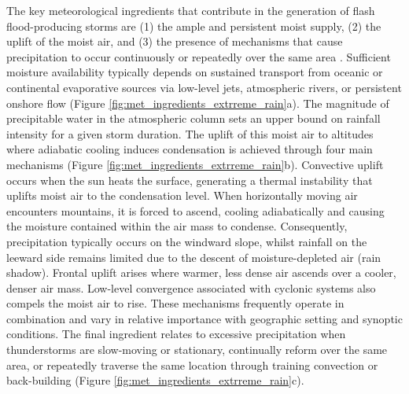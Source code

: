 The  key meteorological ingredients that contribute in the generation of flash flood-producing storms are (1) the ample and persistent moist supply, (2) the uplift of the moist air, and (3) the presence of mechanisms that cause precipitation to occur continuously or repeatedly over the same area \citep{Doswell_1996}. Sufficient moisture availability typically depends on sustained transport from oceanic or continental evaporative sources via low-level jets, atmospheric rivers, or persistent onshore flow (Figure \ref{fig:met_ingredients_extrreme_rain}a). The magnitude of precipitable water in the atmospheric column sets an upper bound on rainfall intensity for a given storm duration. The uplift of this moist air to altitudes where adiabatic cooling induces condensation is achieved through four main mechanisms (Figure \ref{fig:met_ingredients_extrreme_rain}b). Convective uplift occurs when the sun heats the surface, generating a thermal instability that uplifts moist air to the condensation level. When horizontally moving air encounters mountains, it is forced to ascend, cooling adiabatically and causing the moisture contained within the air mass to condense. Consequently, precipitation typically occurs on the windward slope, whilst rainfall on the leeward side remains limited due to the descent of moisture-depleted air (rain shadow). Frontal uplift arises where warmer, less dense air ascends over a cooler, denser air mass. Low-level convergence associated with cyclonic systems also compels the moist air to rise. These mechanisms frequently operate in combination and vary in relative importance with geographic setting and synoptic conditions. The final ingredient relates to excessive precipitation when thunderstorms are slow-moving or stationary, continually reform over the same area, or repeatedly traverse the same location through training convection or back-building (Figure \ref{fig:met_ingredients_extrreme_rain}c).

